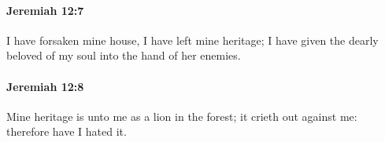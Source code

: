 		\paragraph{Jeremiah 12:7} %
			\label{JEREMIAH-12-7}

			I have forsaken mine house, I have left mine heritage; I have given the dearly beloved of my soul into the hand of her enemies.


		\paragraph{Jeremiah 12:8} %
			\label{JEREMIAH-12-8}

			Mine heritage is unto me as a lion in the forest; it crieth out against me: therefore have I hated it.


